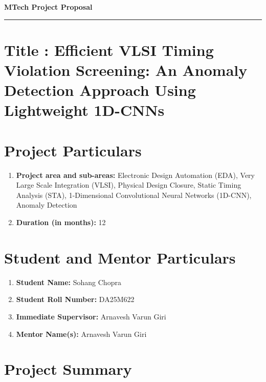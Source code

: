 \documentclass[12pt,a4paper]{article}
\begin{document}
\begin{center}
\textbf{MTech Project Proposal}
\end{center}

\par\noindent\rule{\textwidth}{0.5pt}

\vspace{\baselineskip}
\section{Title : \textnormal{Efficient VLSI Timing Violation Screening: An Anomaly Detection Approach Using Lightweight 1D-CNNs}}

\section{Project Particulars}
\begin{enumerate} [label=(\Alph*)]
    \item \textbf{Project area and sub-areas:} Electronic Design Automation (EDA), Very Large Scale Integration (VLSI), Physical Design Closure, Static Timing Analysis (STA), 1-Dimensional Convolutional Neural Networks (1D-CNN), Anomaly Detection
   \item \textbf{Duration (in months):} 12 
\end{enumerate} 


\section{Student and Mentor Particulars}
\begin{enumerate} [label=(\Alph*)]
    \item \textbf{Student Name:} Sohang Chopra
    \item \textbf{Student Roll Number:} DA25M622
    \item \textbf{Immediate Supervisor:} Arnavesh Varun Giri
    \item \textbf{Mentor Name(s):} Arnavesh Varun Giri
\end{enumerate} 

\section{Project Summary}

\end{document}
